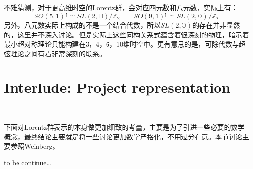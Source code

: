 不难猜测，对于更高维时空的Lorentz群，会对应四元数和八元数，实际上有：
\begin{equation}
	SO(5,1)^\uparrow\cong SL(2,\mathbb{H})/\mathbb{Z}_2\quad\quad
	SO(9,1)^\uparrow\cong SL(2,\mathbb{O})/\mathbb{Z}_2
\end{equation}
另外，八元数实际上构成的不是一个结合代数，所以$SL(2,\mathbb{O})$的存在并非显然的，这里并不深入讨论。但是实际上这些同构关系式蕴含着很深刻的物理，暗示着最小超对称理论只能构建在3，4，6，10维时空中。更有意思的是，可除代数与超弦理论之间有着非常深刻的联系。\cite{Baez1,Baez2}
\section*{Interlude: Project representation}
{\color{red}\hrule}
\hspace*{\fill} \\

下面对Lorentz群表示的本身做更加细致的考量，主要是为了引进一些必要的数学概念，最终结论主要就是将一些讨论更加数学严格化，不用过分在意。本节讨论主要参照Weinberg\cite{Weinberg}。

to be continue\ldots

